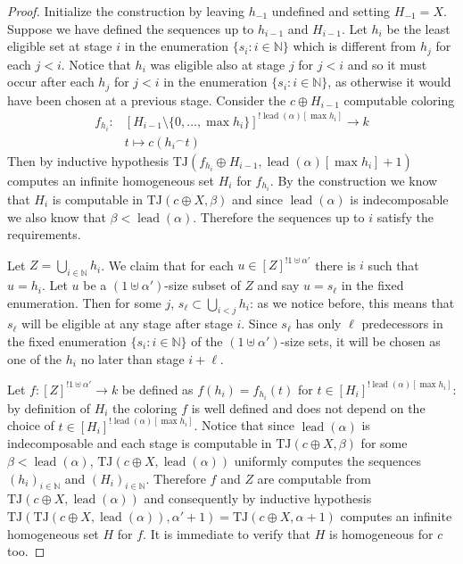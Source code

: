 \documentclass[11pt]{amsart}
\theoremstyle{definition}
\theoremstyle{remark}
\theoremstyle{plain}
\newcommand{\numberset}{\mathbb}
\newcommand{\N}{\numberset{N}}
\def\a{\alpha}
\def\b{\beta}
\def\conc{{}^\smallfrown}
\newcommand{\TJ}{\mathsf{TJ}}
\newcommand{\lead}{\operatorname{lead}}
\def\TJ{{\textrm{TJ}}}
\def\N{{\mathbb{N}}}
\begin{document}
\begin{proof}
Initialize the construction by leaving $h_{-1}$ undefined and setting $H_{-1} = X$.
Suppose we have defined the sequences up to $h_{i-1}$ and $H_{i-1}$.
Let $h_i$ be the least eligible set at stage $i$ in the enumeration $\{s_i : i \in \N \}$ which is different from $h_j$ for each $j < i$.
Notice that $h_i$ was eligible also at stage $j$ for $j<i$ and so it must occur after each $h_j$ for $j<i$ in the enumeration $\{s_i : i \in \N \}$, as otherwise it would have been chosen at a previous stage.
Consider the $c \oplus H_{i-1}$ computable coloring
\begin{align*}
    f_{h_i} \colon & [H_{i-1} \setminus \{0, \ldots, \max h_i\}]^{! \lead(\alpha)[\max h_i]} \to k \\
     & t \mapsto c(h_i \conc t)
\end{align*}
Then by inductive hypothesis $\TJ(f_{h_i} \oplus H_{i-1}, \lead(\alpha)[\max h_i]+1)$ computes an infinite homogeneous set $H_i$ for $f_{h_i}$.
By the construction we know that $H_i$ is computable in $\TJ(c \oplus X, \b)$ and since $\lead(\alpha)$ is indecomposable we also know that $\beta < \lead(\alpha)$.
Therefore the sequences up to $i$ satisfy the requirements.

Let $Z = \bigcup_{i \in \N} h_i$.
We claim that for each $u \in [Z]^{! 1 \uplus \alpha'}$ there is $i$ such that $u = h_i$.
Let $u$ be a $(1 \uplus \a')$-size subset of $Z$ and say $u = s_\ell$ in the fixed enumeration.
Then for some $j$, $s_\ell \subset \bigcup_{i < j} h_i$: as we notice before, this means that $s_\ell$ will be eligible at any stage after stage $i$.
Since $s_\ell$ has only $\ell$ predecessors in the fixed enumeration $\{s_i : i \in \N \}$ of the $(1 \uplus \a')$-size sets, it will be chosen as one of the $h_i$ no later than stage $i+\ell$.

Let $f \colon [Z]^{! 1 \uplus \alpha'} \to k$ be defined as $f(h_i) = f_{h_i} (t)$ for $t \in [H_i]^{! \lead(\alpha)[\max h_i]}$: by definition of $H_i$ the coloring $f$ is well defined and does not depend on the choice of $t \in [H_i]^{! \lead(\alpha)[\max h_i]}$.
Notice that since $\lead(\alpha)$ is indecomposable and each stage is computable in $\TJ(c \oplus X, \beta)$ for some $\beta < \lead(\alpha)$, $\TJ(c \oplus X, \lead(\alpha))$ uniformly computes the sequences $(h_i)_{i \in \N}$ and $(H_i)_{i \in \N}$.
Therefore $f$ and $Z$ are computable from $\TJ(c \oplus X, \lead(\alpha))$ and consequently by inductive hypothesis $\TJ(\TJ(c \oplus X, \lead(\alpha)), \alpha'+1) = \TJ(c \oplus X, \a+1)$ computes an infinite homogeneous set $H$ for $f$.
It is immediate to verify that $H$ is homogeneous for $c$ too.


\end{proof}
\end{document}

